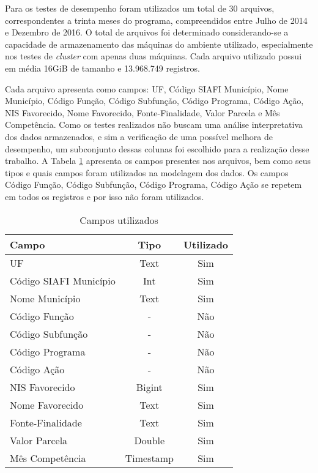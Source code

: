Para os testes de desempenho foram utilizados um total de 30 arquivos, correspondentes a trinta meses do programa, compreendidos entre Julho de 2014 e Dezembro de 2016. O total de arquivos foi determinado considerando-se a capacidade de armazenamento das máquinas do ambiente utilizado, especialmente nos testes de \emph{cluster} com apenas duas máquinas. Cada arquivo utilizado possui em média 16GiB de tamanho e 13.968.749 registros.

Cada arquivo apresenta como campos: UF, Código SIAFI Município, Nome Município, Código Função, Código Subfunção, Código Programa, Código Ação, NIS Favorecido, Nome Favorecido, Fonte-Finalidade, Valor Parcela e Mês Competência. Como os testes realizados não buscam uma análise interpretativa dos dados armazenados, e sim a verificação de uma possível melhora de desempenho, um subconjunto dessas colunas foi escolhido para a realização desse trabalho. A Tabela \ref{tab:colunas} apresenta os campos presentes nos arquivos, bem como seus tipos e quais campos foram utilizados na modelagem dos dados. Os campos Código Função, Código Subfunção, Código Programa, Código Ação se repetem em todos os registros e por isso não foram utilizados.

\begin{table}[]
	\centering
	\caption{Campos utilizados}
	\label{tab:colunas}
	\begin{tabular}{|l|c|c|}
		\hline
		\textbf{Campo}         & \textbf{Tipo} & \textbf{Utilizado} \\ \hline
		UF                     & Text          & Sim                \\ \hline
		Código SIAFI Município & Int           & Sim                \\ \hline
		Nome Município         & Text          & Sim                \\ \hline
		Código Função          & -             & Não                \\ \hline
		Código Subfunção       & -             & Não                \\ \hline
		Código Programa        & -             & Não                \\ \hline
		Código Ação            & -             & Não                \\ \hline
		NIS Favorecido         & Bigint        & Sim                \\ \hline
		Nome Favorecido        & Text          & Sim                \\ \hline
		Fonte-Finalidade       & Text          & Sim                \\ \hline
		Valor Parcela          & Double        & Sim                \\ \hline
		Mês Competência        & Timestamp     & Sim                \\ \hline
	\end{tabular}
\end{table}


